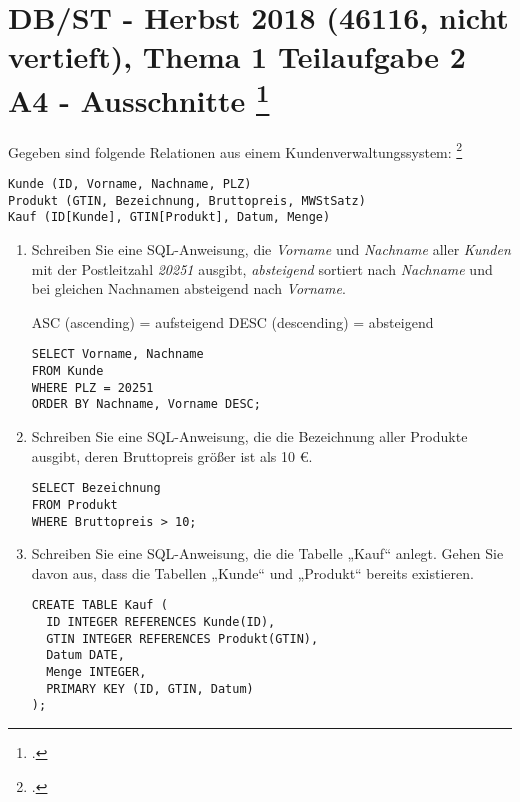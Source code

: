 \documentclass{lehramt-informatik-minimal}
\begin{document}
\section{DB/ST - Herbst 2018 (46116, nicht vertieft), Thema 1 Teilaufgabe 2 A4
- Ausschnitte
\footcite[Aufgabe 6: SQL Einstieg]{db:pu:1}
}

Gegeben sind folgende Relationen aus einem Kundenverwaltungssystem:
\footcite[DB/ST - Herbst 2018 (46116, nicht vertieft), Thema 1 Teilaufgabe 2 A4
- Ausschnitte]{examen:46116:2018:09}

\begin{verbatim}
Kunde (ID, Vorname, Nachname, PLZ)
Produkt (GTIN, Bezeichnung, Bruttopreis, MWStSatz)
Kauf (ID[Kunde], GTIN[Produkt], Datum, Menge)
\end{verbatim}

\begin{enumerate}


\item Schreiben Sie eine SQL-Anweisung, die \emph{Vorname} und
\emph{Nachname} aller \emph{Kunden} mit der Postleitzahl \emph{20251}
ausgibt, \emph{absteigend} sortiert nach \emph{Nachname} und bei
gleichen Nachnamen absteigend nach \emph{Vorname}.

ASC (ascending) = aufsteigend
DESC (descending) = absteigend

\begin{antwort}[muster]
\begin{verbatim}
SELECT Vorname, Nachname
FROM Kunde
WHERE PLZ = 20251
ORDER BY Nachname, Vorname DESC;
\end{verbatim}
\end{antwort}


\item Schreiben Sie eine SQL-Anweisung, die die Bezeichnung aller
Produkte ausgibt, deren Bruttopreis größer ist als 10 €.

\begin{antwort}[muster]
\begin{verbatim}
SELECT Bezeichnung
FROM Produkt
WHERE Bruttopreis > 10;
\end{verbatim}
\end{antwort}


\item Schreiben Sie eine SQL-Anweisung, die die Tabelle „Kauf“ anlegt.
Gehen Sie davon aus, dass die Tabellen „Kunde“ und „Produkt“ bereits
existieren.

\begin{antwort}[muster]
\begin{verbatim}
CREATE TABLE Kauf (
  ID INTEGER REFERENCES Kunde(ID),
  GTIN INTEGER REFERENCES Produkt(GTIN),
  Datum DATE,
  Menge INTEGER,
  PRIMARY KEY (ID, GTIN, Datum)
);
\end{verbatim}
\end{antwort}
\end{enumerate}
\end{document}
